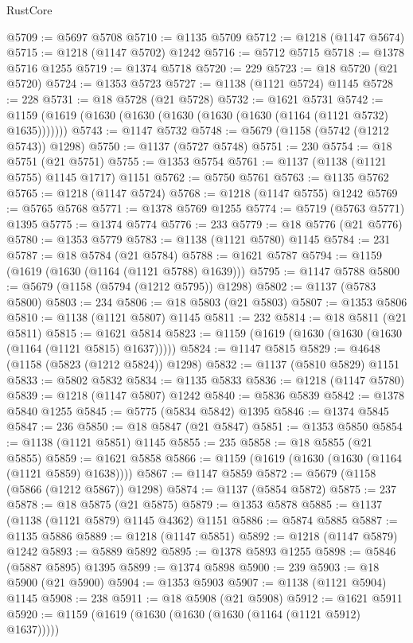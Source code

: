 \begin{lexlean}{RustCore}
\begin{coremodule}
@5709 := @5697 @5708
@5710 := @1135 @5709
@5712 := @1218 (@1147 @5674)
@5715 := @1218 (@1147 @5702) @1242
@5716 := @5712 @5715
@5718 := @1378 @5716 @1255
@5719 := @1374 @5718
@5720 := 229
@5723 := @18 @5720 (@21 @5720)
@5724 := @1353 @5723
@5727 := @1138 (@1121 @5724) @1145
@5728 := 228
@5731 := @18 @5728 (@21 @5728)
@5732 := @1621 @5731
@5742 := @1159 (@1619 (@1630 (@1630 (@1630 (@1630 (@1630 (@1164 (@1121 @5732) @1635)))))))
@5743 := @1147 @5732
@5748 := @5679 (@1158 (@5742 (@1212 @5743)) @1298)
@5750 := @1137 (@5727 @5748)
@5751 := 230
@5754 := @18 @5751 (@21 @5751)
@5755 := @1353 @5754
@5761 := @1137 (@1138 (@1121 @5755) @1145 @1717) @1151
@5762 := @5750 @5761
@5763 := @1135 @5762
@5765 := @1218 (@1147 @5724)
@5768 := @1218 (@1147 @5755) @1242
@5769 := @5765 @5768
@5771 := @1378 @5769 @1255
@5774 := @5719 (@5763 @5771) @1395
@5775 := @1374 @5774
@5776 := 233
@5779 := @18 @5776 (@21 @5776)
@5780 := @1353 @5779
@5783 := @1138 (@1121 @5780) @1145
@5784 := 231
@5787 := @18 @5784 (@21 @5784)
@5788 := @1621 @5787
@5794 := @1159 (@1619 (@1630 (@1164 (@1121 @5788) @1639)))
@5795 := @1147 @5788
@5800 := @5679 (@1158 (@5794 (@1212 @5795)) @1298)
@5802 := @1137 (@5783 @5800)
@5803 := 234
@5806 := @18 @5803 (@21 @5803)
@5807 := @1353 @5806
@5810 := @1138 (@1121 @5807) @1145
@5811 := 232
@5814 := @18 @5811 (@21 @5811)
@5815 := @1621 @5814
@5823 := @1159 (@1619 (@1630 (@1630 (@1630 (@1164 (@1121 @5815) @1637)))))
@5824 := @1147 @5815
@5829 := @4648 (@1158 (@5823 (@1212 @5824)) @1298)
@5832 := @1137 (@5810 @5829) @1151
@5833 := @5802 @5832
@5834 := @1135 @5833
@5836 := @1218 (@1147 @5780)
@5839 := @1218 (@1147 @5807) @1242
@5840 := @5836 @5839
@5842 := @1378 @5840 @1255
@5845 := @5775 (@5834 @5842) @1395
@5846 := @1374 @5845
@5847 := 236
@5850 := @18 @5847 (@21 @5847)
@5851 := @1353 @5850
@5854 := @1138 (@1121 @5851) @1145
@5855 := 235
@5858 := @18 @5855 (@21 @5855)
@5859 := @1621 @5858
@5866 := @1159 (@1619 (@1630 (@1630 (@1164 (@1121 @5859) @1638))))
@5867 := @1147 @5859
@5872 := @5679 (@1158 (@5866 (@1212 @5867)) @1298)
@5874 := @1137 (@5854 @5872)
@5875 := 237
@5878 := @18 @5875 (@21 @5875)
@5879 := @1353 @5878
@5885 := @1137 (@1138 (@1121 @5879) @1145 @4362) @1151
@5886 := @5874 @5885
@5887 := @1135 @5886
@5889 := @1218 (@1147 @5851)
@5892 := @1218 (@1147 @5879) @1242
@5893 := @5889 @5892
@5895 := @1378 @5893 @1255
@5898 := @5846 (@5887 @5895) @1395
@5899 := @1374 @5898
@5900 := 239
@5903 := @18 @5900 (@21 @5900)
@5904 := @1353 @5903
@5907 := @1138 (@1121 @5904) @1145
@5908 := 238
@5911 := @18 @5908 (@21 @5908)
@5912 := @1621 @5911
@5920 := @1159 (@1619 (@1630 (@1630 (@1630 (@1164 (@1121 @5912) @1637)))))

\end{coremodule}
\end{lexlean}
